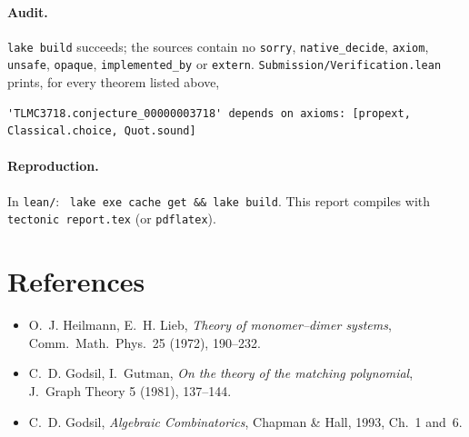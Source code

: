 \documentclass[11pt,a4paper]{article}
\theoremstyle{definition}
\theoremstyle{remark}
\begin{document}
\paragraph{Audit.} \texttt{lake build} succeeds; the sources contain no \texttt{sorry},
\texttt{native\_decide}, \texttt{axiom}, \texttt{unsafe}, \texttt{opaque},
\texttt{implemented\_by} or \texttt{extern}. \texttt{Submission/Verification.lean} prints, for
every theorem listed above,
\begin{lstlisting}
'TLMC3718.conjecture_00000003718' depends on axioms: [propext, Classical.choice, Quot.sound]
\end{lstlisting}

\paragraph{Reproduction.} In \texttt{lean/}: \ \texttt{lake exe cache get \&\& lake build}.
This report compiles with \texttt{tectonic report.tex} (or \texttt{pdflatex}).

\section*{References}
\begin{itemize}\small
\item O.~J. Heilmann, E.~H. Lieb, \emph{Theory of monomer--dimer systems}, Comm.\ Math.\ Phys.\ 25 (1972), 190--232.
\item C.~D. Godsil, I.~Gutman, \emph{On the theory of the matching polynomial}, J.\ Graph Theory 5 (1981), 137--144.
\item C.~D. Godsil, \emph{Algebraic Combinatorics}, Chapman \& Hall, 1993, Ch.~1 and~6.
\end{itemize}
\end{document}
